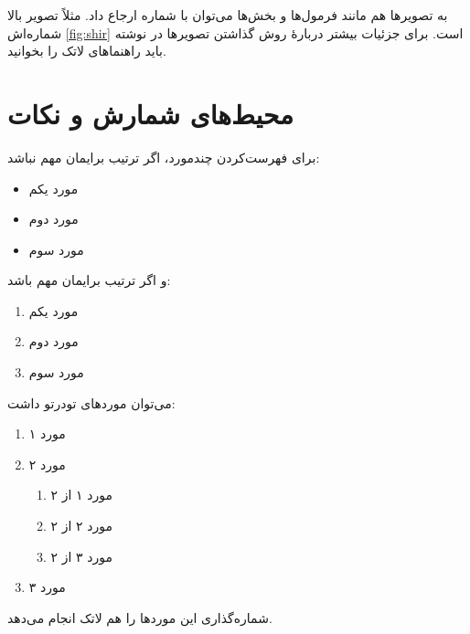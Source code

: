 به تصویرها هم مانند فرمول‌ها و بخش‌ها می‌توان با شماره ارجاع داد. مثلاً تصویر بالا شماره‌اش \ref{fig:shir} است. برای جزئیات بیشتر دربارهٔ روش گذاشتن تصویرها در نوشته باید راهنماهای لاتک را بخوانید.

\section{محیط‌های شمارش و نکات}
برای فهرست‌کردن چندمورد، اگر ترتیب برایمان مهم نباشد:
\begin{itemize}
\item مورد یکم
\item مورد دوم
\item مورد سوم
\end{itemize}
و اگر ترتیب برایمان مهم باشد:
\begin{enumerate}
\item مورد یکم
\item مورد دوم
\item مورد سوم
\end{enumerate}
می‌توان موردهای تودرتو داشت:
\begin{enumerate}
\item مورد ۱
\item مورد ۲
\begin{enumerate}
\item مورد ۱ از ۲
\item مورد ۲ از ۲
\item مورد ۳ از ۲
\end{enumerate}
\item مورد ۳
\end{enumerate}
شماره‌گذاری این موردها را هم لاتک انجام می‌دهد.

